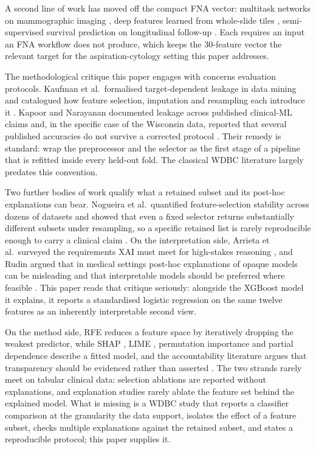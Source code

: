 \documentclass[review,12pt]{elsarticle}
\begin{document}
A second line of work has moved off the compact FNA vector: multitask networks on mammographic imaging \cite{shi2022emtn}, deep features learned from whole-slide tiles \cite{lee2020unsupervised}, semi-supervised survival prediction on longitudinal follow-up \cite{hassanzadeh2015semi}. Each requires an input an FNA workflow does not produce, which keeps the 30-feature vector the relevant target for the aspiration-cytology setting this paper addresses.

The methodological critique this paper engages with concerns evaluation protocols. Kaufman et al.\ formalised target-dependent leakage in data mining and catalogued how feature selection, imputation and resampling each introduce it \cite{kaufman2012leakage}. Kapoor and Narayanan documented leakage across published clinical-ML claims and, in the specific case of the Wisconsin data, reported that several published accuracies do not survive a corrected protocol \cite{kapoor2023leakage}. Their remedy is standard: wrap the preprocessor and the selector as the first stage of a pipeline that is refitted inside every held-out fold. The classical WDBC literature largely predates this convention.

Two further bodies of work qualify what a retained subset and its post-hoc explanations can bear. Nogueira et al.\ quantified feature-selection stability across dozens of datasets and showed that even a fixed selector returns substantially different subsets under resampling, so a specific retained list is rarely reproducible enough to carry a clinical claim \cite{nogueira2018stability}. On the interpretation side, Arrieta et al.\ surveyed the requirements XAI must meet for high-stakes reasoning \cite{arrieta2020xaiconcept}, and Rudin argued that in medical settings post-hoc explanations of opaque models can be misleading and that interpretable models should be preferred where feasible \cite{rudin2019stop}. This paper reads that critique seriously: alongside the XGBoost model it explains, it reports a standardised logistic regression on the same twelve features as an inherently interpretable second view.

On the method side, RFE \cite{guyon2002rfe} reduces a feature space by iteratively dropping the weakest predictor, while SHAP \cite{lundberg2017shap}, LIME \cite{ribeiro2016lime}, permutation importance \cite{altmann2010universal} and partial dependence \cite{friedman2001greedy} describe a fitted model, and the accountability literature argues that transparency should be evidenced rather than asserted \cite{gianfagna2021xai,narayanan2007ai}. The two strands rarely meet on tabular clinical data: selection ablations are reported without explanations, and explanation studies rarely ablate the feature set behind the explained model. What is missing is a WDBC study that reports a classifier comparison at the granularity the data support, isolates the effect of a feature subset, checks multiple explanations against the retained subset, and states a reproducible protocol; this paper supplies it.
\end{document}
